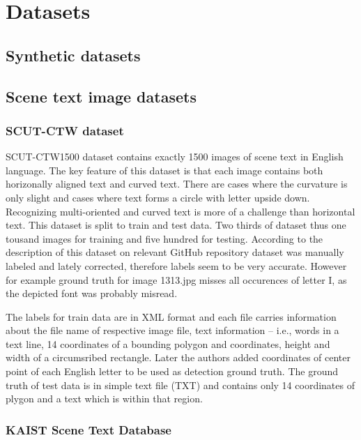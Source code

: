 \chapter{Datasets}

\section{Synthetic datasets}
\section{Scene text image datasets}
\subsection*{SCUT-CTW dataset}

SCUT-CTW1500 dataset contains exactly 1500 images of scene text in English language. The key feature of this dataset is that each image contains both horizonally aligned text and curved text. There are cases where the curvature is only slight and cases where text forms a circle with letter upside down. Recognizing multi-oriented and curved text is more of a challenge than  horizontal text. This dataset is split to train and test data. Two thirds of dataset thus one tousand images for training and five hundred for testing. According to the description of this dataset on relevant GitHub repository dataset was manually labeled and lately corrected, therefore labels seem to be very accurate. However for example ground truth for image 1313.jpg misses all occurences of letter I, as the depicted font was probably misread.\cite{ctw,ctw2}

The labels for train data are in XML format and each file carries information about the file name of respective image file, text information -- i.e., words in a text line, 14 coordinates of a bounding polygon and coordinates, height and width of a circumsribed rectangle. Later the authors added coordinates of center point of each English letter to be used as detection ground truth. The ground truth of test data is in simple text file (TXT) and contains only 14 coordinates of plygon and a text which is within that region.

\subsection*{KAIST Scene Text Database}

